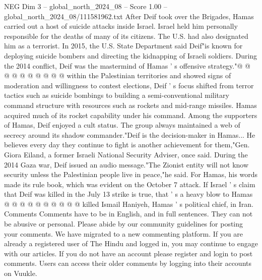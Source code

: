 \begin{textsample}{NEG Dim 3 – global\_north\_2024\_08 – Score 1.00 – global\_north\_2024\_08/111581962.txt}
After Deif took over the Brigades, Hamas carried out a host of suicide attacks inside Israel.
Israel held him personally responsible for the deaths of many of its citizens.
The U.S. had also designated him as a terrorist.
In 2015, the U.S.
State Department said Deif"is known for deploying suicide bombers and directing the kidnapping of Israeli soldiers.
During the 2014 conflict, Deif was the mastermind of Hamas ' s offensive strategy."@ @ @ @ @ @ @ @ @ @ within the Palestinian territories and showed signs of moderation and willingness to contest elections, Deif ' s focus shifted from terror tactics such as suicide bombings to building a semi-conventional military command structure with resources such as rockets and mid-range missiles.
Hamas acquired much of its rocket capability under his command.
Among the supporters of Hamas, Deif enjoyed a cult status.
The group always maintained a web of secrecy around its shadow commander."Deif is the decision-maker in Hamas...
He believes every day they continue to fight is another achievement for them,"Gen.
Giora Eiland, a former Israeli National Security Adviser, once said.
During the 2014 Gaza war, Deif issued an audio message."The Zionist entity will not know security unless the Palestinian people live in peace,"he said.
For Hamas, his words made its rule book, which was evident on the October 7 attack.
If Israel ' s claim that Deif was killed in the July 13 strike is true, that ' s a heavy blow to Hamas @ @ @ @ @ @ @ @ @ @ killed Ismail Haniyeh, Hamas ' s political chief, in Iran.
Comments Comments have to be in English, and in full sentences.
They can not be abusive or personal.
Please abide by our community guidelines for posting your comments.
We have migrated to a new commenting platform.
If you are already a registered user of The Hindu and logged in, you may continue to engage with our articles.
If you do not have an account please register and login to post comments.
Users can access their older comments by logging into their accounts on Vuukle.

\end{textsample}
